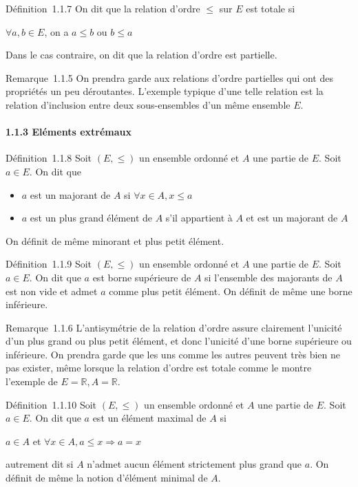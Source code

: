 Définition~1.1.7 On dit que la relation d'ordre $\leqslant$ sur $E$ est totale si

$\forall a,b \in E$, on a $a \leqslant b$ ou $b \leqslant a$

Dans le cas contraire, on dit que la relation d'ordre est partielle.

Remarque~1.1.5 On prendra garde aux relations d'ordre partielles qui ont
des propriétés un peu déroutantes. L'exemple typique d'une telle
relation est la relation d'inclusion entre deux sous-ensembles d'un même
ensemble $E$.

\paragraph{1.1.3 Eléments extrémaux}

Définition~1.1.8 Soit $(E,\leqslant)$ un ensemble ordonné et $A$ une partie de $E$.
Soit $a \in E$. On dit que

\begin{itemize}
\itemsep1pt\parskip0pt
\item
  $a$ est un majorant de $A$ si $\forall x \in A, x \leqslant a$
\item
  $a$ est un plus grand élément de $A$ s'il appartient à $A$ et est un
  majorant de $A$
\end{itemize}

On définit de même minorant et plus petit élément.

Définition~1.1.9 Soit $(E,\leqslant)$ un ensemble ordonné et $A$ une partie de $E$.
Soit $a \in E$. On dit que $a$ est borne supérieure de $A$ si l'ensemble des
majorants de $A$ est non vide et admet $a$ comme plus petit élément. On
définit de même une borne inférieure.

Remarque~1.1.6 L'antisymétrie de la relation d'ordre assure clairement
l'unicité d'un plus grand ou plus petit élément, et donc l'unicité d'une
borne supérieure ou inférieure. On prendra garde que les uns comme les
autres peuvent très bien ne pas exister, même lorsque la relation
d'ordre est totale comme le montre l'exemple de $E = \mathbb{R}, A = \mathbb{R}$.

Définition~1.1.10 Soit $(E,\leqslant)$ un ensemble ordonné et $A$ une partie de $E$.
Soit $a \in E$. On dit que $a$ est un élément maximal de $A$ si

$a \in A$ et $\forall x \in A, a \leqslant x \Rightarrow a = x$

autrement dit si $A$ n'admet aucun élément strictement plus grand que $a$.
On définit de même la notion d'élément minimal de $A$.

